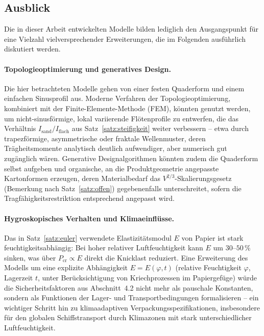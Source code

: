 ﻿\documentclass[a4paper,12pt]{article}
\theoremstyle{definition}
\begin{document}
\subsection{Ausblick}

Die in dieser Arbeit entwickelten Modelle bilden lediglich den Ausgangspunkt für
eine Vielzahl vielversprechender Erweiterungen, die im Folgenden ausführlich
diskutiert werden.

\paragraph{Topologieoptimierung und generatives Design.}
Die hier betrachteten Modelle gehen von einer festen Quaderform und einem
einfachen Sinusprofil aus. Moderne Verfahren der Topologieoptimierung, kombiniert
mit der Finite-Elemente-Methode (FEM), könnten genutzt werden, um nicht-sinusförmige,
lokal variierende Flötenprofile zu entwerfen, die das Verhältnis
$I_{\mathrm{sand}}/I_{\mathrm{flach}}$ aus Satz~\ref{satz:steifigkeit} weiter
verbessern -- etwa durch trapezförmige, asymmetrische oder fraktale Wellenmuster,
deren Trägheitsmomente analytisch deutlich aufwendiger, aber numerisch gut
zugänglich wären. Generative Designalgorithmen könnten zudem die Quaderform selbst
aufgeben und organische, an die Produktgeometrie angepasste Kartonformen
erzeugen, deren Materialbedarf das $V^{2/3}$-Skalierungsgesetz (Bemerkung nach
Satz~\ref{satz:offen}) gegebenenfalls unterschreitet, sofern die
Tragfähigkeitsrestriktion entsprechend angepasst wird.

\paragraph{Hygroskopisches Verhalten und Klimaeinflüsse.}
Das in Satz~\ref{satz:euler} verwendete Elastizitätsmodul $E$ von Papier ist
stark feuchtigkeitsabhängig: Bei hoher relativer Luftfeuchtigkeit kann $E$ um
$30$--$50\,\%$ sinken, was über $P_{\mathrm{cr}} \propto E$ direkt die Knicklast
reduziert. Eine Erweiterung des Modells um eine explizite Abhängigkeit
$E = E(\varphi, t)$ (relative Feuchtigkeit $\varphi$, Lagerzeit $t$, unter
Berücksichtigung von Kriechprozessen im Papiergefüge) würde die
Sicherheitsfaktoren aus Abschnitt~4.2 nicht mehr als pauschale Konstanten,
sondern als Funktionen der Lager- und Transportbedingungen formalisieren --
ein wichtiger Schritt hin zu klimaadaptiven Verpackungsspezifikationen,
insbesondere für den globalen Schiffstransport durch Klimazonen mit stark
unterschiedlicher Luftfeuchtigkeit.
\end{document}
